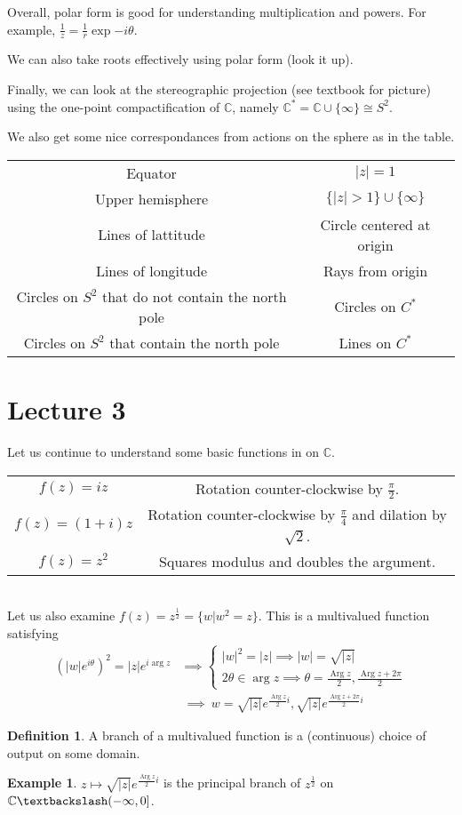 \documentclass[11pt,leqno,oneside]{amsart}
\newcommand{\C}{{\mathbb C}} %
\newcommand{\Arg}{\operatorname{Arg}}
\theoremstyle{definition}
\newtheorem{defn}[thm]{Definition}
\newtheorem{example}[thm]{Example}
\numberwithin{equation}{section}
\begin{document}
Overall, polar form is good for understanding multiplication and powers. For example, $\frac{1}{z} = \frac{1}{r} \exp{-i \theta}$. 

We can also take roots effectively using polar form (look it up).

Finally, we can look at the stereographic projection (see textbook for picture) using the one-point compactification of $\C$, namely $\C^* = \C \cup \{\infty\} \cong S^2$. 

We also get some nice correspondances from actions on the sphere as in the table. \\
    \begin{tabular}{|c|c|}
        \hline
        Equator & $|z| = 1$ \\
        Upper hemisphere & $\{|z| > 1\} \cup \{\infty\}$ \\
        Lines of lattitude & Circle centered at origin \\
        Lines of longitude & Rays from origin \\
        Circles on $S^2$ that do not contain the north pole & Circles on $C^*$ \\
        Circles on $S^2$ that contain the north pole & Lines on $C^*$ \\
        \hline
    \end{tabular}
\section{Lecture 3}

Let us continue to understand some basic functions in on $\C$. \\
\begin{tabular}{|c|c|}
    \hline
    $f(z) = iz$ & Rotation counter-clockwise by $\frac{\pi}{2}$. \\
    $f(z) = (1+i)z$ & Rotation counter-clockwise by $\frac{\pi}{4}$ and dilation by $\sqrt{2}$. \\
    $f(z) = z^2$ & Squares modulus and doubles the argument. \\
   \hline 
\end{tabular} \\
Let us also examine $f(z) = z^{\frac{1}{2}} = \{w | w^2=z\}$. This is a multivalued function satisfying 
\begin{align*}
    (|w|e^{i\theta})^2 = |z|e^{i \arg z} & \implies \begin{cases}
        |w|^2 = |z| \implies |w| = \sqrt{|z|} \\
        2\theta \in \arg z \implies \theta = \frac{\Arg z}{2}, \frac{\Arg z + 2\pi}{2}
    \end{cases} \\
    \ & \ \implies \ w = \sqrt{|z|}e^{\frac{\Arg z}{2}i}, \sqrt{|z|}e^{\frac{\Arg z + 2\pi}{2} i}
\end{align*}
\begin{defn}
    A branch of a multivalued function is a (continuous) choice of output on some domain.
\end{defn}
\begin{example}
    $z \mapsto \sqrt{|z|}e^{\frac{\Arg z}{2}i}$ is the principal branch of
    $z^{\frac{1}{2}}$ on $\C \textbackslash (-\infty,0]$.
\end{example}
\end{document}
